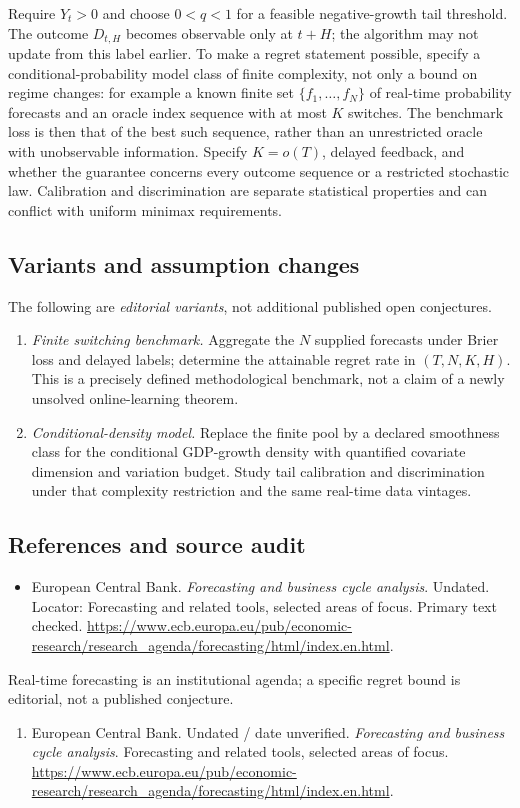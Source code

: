 \documentclass[11pt,a4paper]{article}
\begin{document}
Require \(Y_t>0\) and choose \(0<q<1\) for a feasible negative-growth tail threshold. The outcome \(D_{t,H}\) becomes observable only at \(t+H\); the algorithm may not update from this label earlier. To make a regret statement possible, specify a conditional-probability model class of finite complexity, not only a bound on regime changes: for example a known finite set \(\{f_1,\ldots,f_N\}\) of real-time probability forecasts and an oracle index sequence with at most \(K\) switches. The benchmark loss is then that of the best such sequence, rather than an unrestricted oracle with unobservable information. Specify \(K=o(T)\), delayed feedback, and whether the guarantee concerns every outcome sequence or a restricted stochastic law. Calibration and discrimination are separate statistical properties and can conflict with uniform minimax requirements.
\subsection*{Variants and assumption changes}
The following are \emph{editorial variants}, not additional published open conjectures.
\begin{enumerate}
\item \emph{Finite switching benchmark.} Aggregate the \(N\) supplied forecasts under Brier loss and delayed labels; determine the attainable regret rate in \((T,N,K,H)\). This is a precisely defined methodological benchmark, not a claim of a newly unsolved online-learning theorem.
\item \emph{Conditional-density model.} Replace the finite pool by a declared smoothness class for the conditional GDP-growth density with quantified covariate dimension and variation budget. Study tail calibration and discrimination under that complexity restriction and the same real-time data vintages.
\end{enumerate}
\subsection*{References and source audit}
\begin{itemize}
\item European Central Bank. \emph{Forecasting and business cycle analysis}. Undated. Locator: Forecasting and related tools, selected areas of focus. Primary text checked. \url{https://www.ecb.europa.eu/pub/economic-research/research_agenda/forecasting/html/index.en.html}.
\end{itemize}
Real-time forecasting is an institutional agenda; a specific regret bound is editorial, not a published conjecture.
\begin{enumerate}\raggedright
\item\hypertarget{definitions:source:30007520:1}{} European Central Bank. Undated / date unverified. \emph{Forecasting and business cycle analysis}. Forecasting and related tools, selected areas of focus.
\url{https://www.ecb.europa.eu/pub/economic-research/research_agenda/forecasting/html/index.en.html}.
\end{enumerate}
\end{document}
